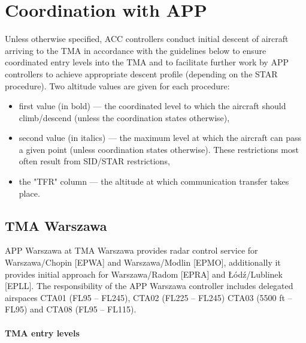 
\chapter{Coordination with APP}
\label{chap:acc:coordination}

Unless otherwise specified, ACC controllers conduct initial descent of aircraft
arriving to the TMA in accordance with the guidelines below to ensure
coordinated entry levels into the TMA and to facilitate further work by APP
controllers to achieve appropriate descent profile (depending on the STAR
procedure). Two altitude values are given for each procedure:
\begin{itemize}
\item first value (in bold) --- the coordinated level to which the aircraft
  should climb/descend (unless the coordination states otherwise),
\item second value (in italics) --- the maximum level at which the aircraft can
  pass a given point (unless coordination states otherwise). These restrictions
  most often result from SID/STAR restrictions,
\item the "TFR" column --- the altitude at which communication transfer takes
  place.
\end{itemize}

\section{TMA Warszawa}
\label{sec:acc:coordination:Warszawa}

APP Warszawa at TMA Warszawa provides radar control service for Warszawa/Chopin
[EPWA] and Warszawa/Modlin [EPMO], additionally it provides initial approach for
Warszawa/Radom [EPRA] and Łódź/Lublinek [EPLL]. The responsibility of the APP
Warszawa controller includes delegated airspaces CTA01 (FL95 -- FL245), CTA02
(FL225 -- FL245) CTA03 (5500 ft -- FL95) and CTA08 (FL95 -- FL115).

\subsubsection{TMA entry levels}



